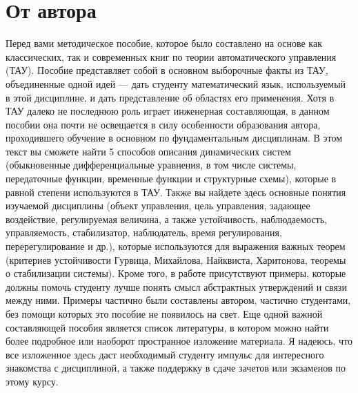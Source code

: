 \documentclass[../../TAU.tex]{subfiles}
\begin{document}
    \chapter*{От автора}

        Перед вами методическое пособие, которое было составлено на основе как классических, так и современных книг по теории автоматического управления (ТАУ).  
        Пособие представляет собой в основном выборочные факты из ТАУ, объединенные одной идей — дать студенту математический язык, используемый в этой дисциплине, и дать представление об областях его применения.
        Хотя в ТАУ далеко не последнюю роль играет инженерная составляющая, в данном пособии она почти не освещается в силу особенности образования автора, проходившего обучение в основном по фундаментальным дисциплинам. 
        В этом текст вы сможете найти 5 способов описания динамических систем (обыкновенные дифференциальные уравнения, в том числе системы, передаточные функции, временные функции и структурные схемы), которые в равной степени используются в ТАУ. Также вы найдете здесь основные понятия изучаемой дисциплины (объект управления, цель управления, задающее воздействие, регулируемая величина, а также устойчивость, наблюдаемость, управляемость, стабилизатор, наблюдатель, время регулирования, перерегулирование и др.), которые используются для выражения важных теорем (критериев устойчивости Гурвица, Михайлова, Найквиста, Харитонова, теоремы о стабилизации системы). Кроме того, в работе присутствуют примеры, которые должны помочь студенту лучше понять смысл абстрактных утверждений и связи между ними. Примеры частично были составлены автором, частично студентами, без помощи которых это пособие не появилось на свет. 
        Еще одной важной составляющей пособия является список литературы, в котором можно найти более подробное или наоборот пространное изложение материала. 
        Я надеюсь, что все изложенное здесь даст необходимый студенту импульс для интересного знакомства с дисциплиной, а также поддержку в сдаче зачетов или экзаменов по этому курсу.
\end{document}
